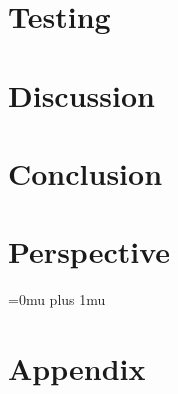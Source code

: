 





















\clearpage
\chapter{Testing}\label{ch:testing}


\clearpage
\chapter{Discussion}\label{ch:discussion}



\clearpage
\chapter{Conclusion}\label{ch:conclusion}



\clearpage
\chapter{Perspective}\label{ch:perspective}



\clearpage
\Urlmuskip=0mu plus 1mu\relax
\sloppy

{}

\chapter{Appendix}\label{ch:appendix}



